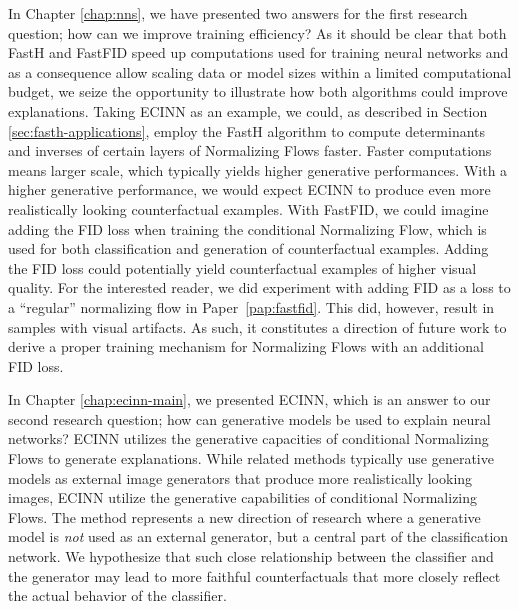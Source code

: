 \documentclass[11pt,a4paper,twoside,openright,final]{memoir}
\newcommand*{\paperref}[1]{Paper~\hyperref[#1]{\ref{#1}}}
\begin{document}
In Chapter \ref{chap:nns}, we have presented two answers for the first research question; how can we improve training efficiency?
As it should be clear that both FastH and FastFID speed up computations used for training neural networks and as a consequence allow scaling data or model sizes within a limited computational budget, we seize the opportunity to illustrate how both algorithms could improve explanations.
Taking ECINN as an example, we could, as described in Section \ref{sec:fasth-applications}, employ the FastH algorithm to compute determinants and inverses of certain layers of Normalizing Flows faster.
Faster computations means larger scale, which typically yields higher generative performances.
With a higher generative performance, we would expect ECINN to produce even more realistically looking counterfactual examples. 
With FastFID, we could imagine adding the FID loss when training the conditional Normalizing Flow, which is used for both classification and generation of counterfactual examples.
Adding the FID loss could potentially yield counterfactual examples of higher visual quality.
For the interested reader, we did experiment with adding FID as a loss to a ``regular'' normalizing flow in \paperref{pap:fastfid}.
This did, however, result in samples with visual artifacts.
As such, it constitutes a direction of future work to derive a proper training mechanism for Normalizing Flows with an additional FID loss. 

In Chapter \ref{chap:ecinn-main}, we presented ECINN, which is an answer to our second research question; how can generative models be used to explain neural networks?
ECINN utilizes the generative capacities of conditional Normalizing Flows to generate explanations. 
While related methods typically use generative models as external image generators that produce more realistically looking images, ECINN utilize the generative capabilities of  conditional Normalizing Flows. %
The method represents a new direction of research where a generative model is \emph{not} used as an external generator, but a central part of the classification network.
We hypothesize that such close relationship between the classifier and the generator may lead to more faithful counterfactuals that more closely reflect the actual behavior of the classifier. 
\end{document}
